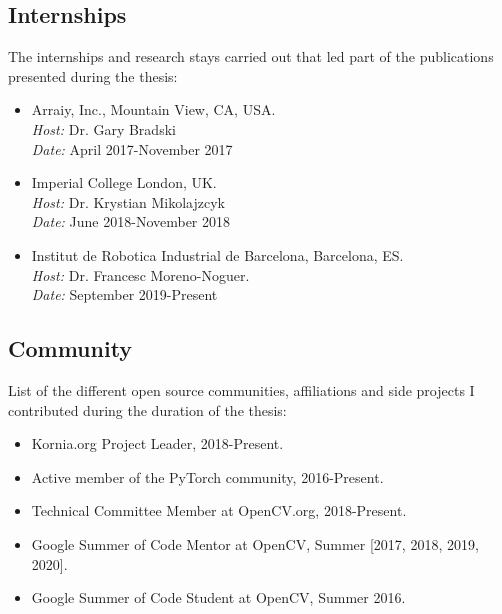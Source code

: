\subsection{Internships}

The internships and research stays carried out that led part of the publications presented during the thesis:\\

\begin{itemize}
\item Arraiy, Inc., Mountain View, CA, USA.\\
\textit{Host:} Dr. Gary Bradski\\
\textit{Date:} April 2017-November 2017\\
\item Imperial College London, UK.\\
\textit{Host:} Dr. Krystian Mikolajzcyk\\
\textit{Date:} June 2018-November 2018\\
\item Institut de Robotica Industrial de Barcelona, Barcelona, ES. \\
\textit{Host:} Dr. Francesc Moreno-Noguer.\\
\textit{Date:} September 2019-Present\\
\end{itemize}

\subsection{Community}

List of the different open source communities, affiliations and side projects I contributed during the duration of the thesis:\\

\begin{itemize}
\item Kornia.org Project Leader, 2018-Present.
\item Active member of the PyTorch community, 2016-Present.
\item Technical Committee Member at OpenCV.org, 2018-Present.
\item Google Summer of Code Mentor at OpenCV, Summer [2017, 2018, 2019, 2020].
\item Google Summer of Code Student at OpenCV, Summer 2016.
\end{itemize}